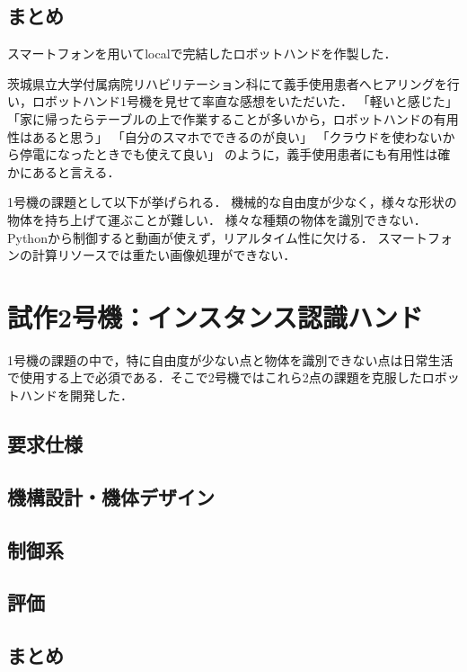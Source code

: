 \subsection{まとめ}
スマートフォンを用いてlocalで完結したロボットハンドを作製した．


茨城県立大学付属病院リハビリテーション科にて義手使用患者へヒアリングを行い，ロボットハンド1号機を見せて率直な感想をいただいた．
「軽いと感じた」
「家に帰ったらテーブルの上で作業することが多いから，ロボットハンドの有用性はあると思う」
「自分のスマホでできるのが良い」
「クラウドを使わないから停電になったときでも使えて良い」
のように，義手使用患者にも有用性は確かにあると言える．

1号機の課題として以下が挙げられる．
機械的な自由度が少なく，様々な形状の物体を持ち上げて運ぶことが難しい．
様々な種類の物体を識別できない．
Pythonから制御すると動画が使えず，リアルタイム性に欠ける．
スマートフォンの計算リソースでは重たい画像処理ができない．


\section{試作2号機：インスタンス認識ハンド}
1号機の課題の中で，特に自由度が少ない点と物体を識別できない点は日常生活で使用する上で必須である．そこで2号機ではこれら2点の課題を克服したロボットハンドを開発した．

\subsection{要求仕様}


\subsection{機構設計・機体デザイン}



\subsection{制御系}


\subsection{評価}


\subsection{まとめ}




